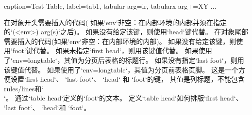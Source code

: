   \begin{examplecode}

  \begin{tableobject}{caption=Test Table, label=tab1, tabular arg=lr, tabularx arg+=XY}
      ...
  \end{tableobject}
  \end{examplecode}

\bigpar

  在对象开头需要插入的代码(
  如果`env`非空：在内部环境的内部并须在指定的`(<env>) arg(s)`之后)。
  如果没有给定该键，则使用`head`键代替。
  在对象尾部需要插入的代码(如果`env`非空：在内部环境的内部)。
  如果没有给定该键，则使用`foot`键代替。
  如果未指定`first head`，则用该键值代替。
  如果使用了`env=longtable`，其值为分页后表格的标题行。
  如果没有指定`last foot`，则用该键值代替。
  如果使用了`env=longtable`，其值为分页前表格页脚。
  这是一个方便设置`first head`、 `last foot`、 `head` 和 `foot`的键，
  其值是列标题，不能包含rules\slash lines和`\\`。
  通过`table head`定义的`foot`的文本。
  定义`table head`如何排版`first head`、 `last foot`、 `head`和 `foot`。

